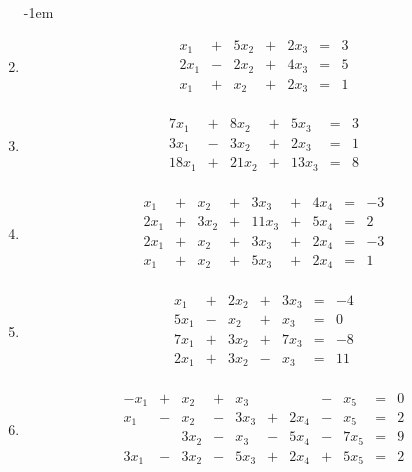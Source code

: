 			\begin{enumerate}\abovedisplayskip-1em
				\item 
				
					\[
						\begin{array} {ccccccc}
							x_1 & + & 5 x_2 & + & 2 x_3 & = & 3 \\
							2 x_1 & - & 2 x_2 & + & 4 x_3 & = & 5\\
							x_1 & + & x_2 & + & 2 x_3 & = & 1\\
						\end{array}
					\]
				
				\item
				
					\[
						\begin{array} {ccccccc}
							7 x_1 & + & 8 x_2 & + & 5 x_3 & = & 3 \\
							3 x_1 & - & 3 x_2 & + & 2 x_3 & = & 1\\
							18 x_1 & + & 21 x_2 & + & 13 x_3 & = & 8\\
						\end{array}
					\]
				
				\item
					
					\[
						\begin{array} {ccccccccc}
							x_1 & + & x_2 & + & 3 x_3 & + & 4 x_4 & = & -3 \\
							2 x_1 & + & 3 x_2 & + & 11 x_3 & + & 5 x_4 & = & 2\\
							2 x_1 & + & x_2 & + & 3 x_3 & + & 2 x_4 & = & -3\\
							x_1 & + & x_2 & + & 5 x_3 & + & 2 x_4 & = & 1\\
						\end{array}
					\]	
						
				\item
					
					\[
						\begin{array} {ccccccc}
							x_1 & + & 2 x_2 & + & 3 x_3 & = & -4 \\
							5 x_1 & - & x_2 & + & x_3 & = & 0\\
							7 x_1 & + & 3 x_2 & + & 7 x_3 & = & -8\\
							2 x_1 & + & 3 x_2 & - & x_3 & = & 11\\
						\end{array}
					\]
						
				\item
					
					\[
						\begin{array} {cccccccccccc}
							- x_1 & + & x_2 & + & x_3 & & & - & x_5 & = & 0 \\
							x_1 & - & x_2 & - & 3 x_3 & + & 2 x_4 & - & x_5 & = & 2\\
							& & 3 x_2 & - & x_3 & - & 5 x_4 & - & 7 x_5 & = & 9\\
							3 x_1 & - & 3 x_2 & - & 5 x_3 & + & 2 x_4 & + & 5 x_5 & = & 2\\
						\end{array}
					\]	
	

\end{enumerate}
